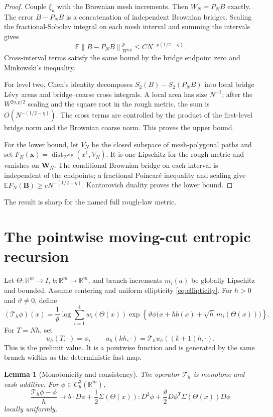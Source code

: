 \documentclass[11pt,reqno]{amsart}
\newtheorem{lemma}[theorem]{Lemma}
\theoremstyle{definition}
\theoremstyle{remark}
\newcommand{\E}{\mathbb E}
\newcommand{\R}{\mathbb R}
\newcommand{\dist}{\operatorname{dist}}
\newcommand{\norm}[1]{\left\lVert #1\right\rVert}
\begin{document}
\begin{proof}
Couple $\xi_k$ with the Brownian mesh increments.  Then $W_N=P_NB$ exactly.
The error $B-P_NB$ is a concatenation of independent Brownian bridges.
Scaling the fractional-Sobolev integral on each mesh interval and summing the
intervals gives
\[
 \E\norm{B-P_NB}_{W^{\eta,p}}^p
 \le C N^{-p(1/2-\eta)}.
\]
Cross-interval terms satisfy the same bound by the bridge endpoint zero and
Minkowski's inequality.

For level two, Chen's identity decomposes
$S_2(B)-S_2(P_NB)$ into local bridge L\'evy areas and bridge--coarse cross
integrals.  A local area has size $N^{-1}$; after the
$W^{2\eta,p/2}$ scaling and the square root in the rough metric, the sum is
$O(N^{-(1/2-\eta)})$.  The cross terms are controlled by the product of the
first-level bridge norm and the Brownian coarse norm.  This proves the upper
bound.

For the lower bound, let $V_N$ be the closed subspace of mesh-polygonal paths
and set
$F_N(\mathbf x)=\dist_{W^{\eta,p}}(x^1,V_N)$.  It is one-Lipschitz for the
rough metric and vanishes on $\mathbf W_N$.  The conditional Brownian bridge on
each interval is independent of the endpoints; a fractional Poincar\'e
inequality and scaling give
$\E F_N(\mathbf B)\ge cN^{-(1/2-\eta)}$.  Kantorovich duality proves the lower
bound.
\end{proof}

The result is sharp for the named full rough-law metric.

\section{The pointwise moving-cut entropic recursion}\label{sec:HJB}

Let $\Theta:\R^m\to I$, $b:\R^m\to\R^m$, and branch increments
$m_i(a)$ be globally Lipschitz and bounded.  Assume centering and uniform
ellipticity \eqref{eq:ellipticity}.  For $h>0$ and $\vartheta\ne0$, define
\begin{equation}\label{eq:Th}
 (\mathcal T_h\phi)(x)=\frac1\vartheta\log
 \sum_{i=1}^4w_i(\Theta(x))
 \exp\left\{\vartheta
 \phi\bigl(x+h b(x)+\sqrt h\,m_i(\Theta(x))\bigr)\right\}.
\end{equation}
For $T=Nh$, set
\[
 u_h(T,\cdot)=\phi,
 \qquad u_h(kh,\cdot)=\mathcal T_hu_h((k+1)h,\cdot).
\]
This is the prelimit value.  It is a pointwise function and is generated by the
same branch widths as the deterministic fast map.

\begin{lemma}[Monotonicity and consistency]\label{lem:consistency}
The operator $\mathcal T_h$ is monotone and cash additive.  For
$\phi\in C_b^3(\R^m)$,
\begin{equation}\label{eq:consistency}
 \frac{\mathcal T_h\phi-\phi}{h}
 \longrightarrow b\cdot D\phi
 +\frac12\Sigma(\Theta(x)):D^2\phi
 +\frac\vartheta2D\phi^T\Sigma(\Theta(x))D\phi
\end{equation}
locally uniformly.
\end{lemma}
\end{document}
